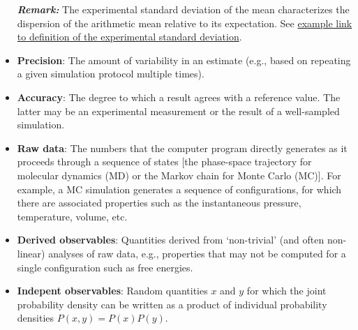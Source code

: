 \begin{itemize}
\textbf{\textit{Remark:}} The experimental standard deviation of the mean characterizes the dispersion of the arithmetic mean relative to its expectation.
See \hyperref[def:exp_st_dev]{example link to definition of the experimental standard deviation}.
  
\item {\bf Precision}: The amount of variability in an estimate (e.g., based on repeating a given simulation protocol multiple times).  %
  
  
\item {\bf Accuracy}: The degree to which a result agrees with a reference value.
The latter may be an experimental measurement or the result of a well-sampled simulation.  
  
\item {\bf Raw data}: The numbers that the computer program directly generates as it proceeds through a sequence of states [the phase-space trajectory for molecular dynamics (MD) or the Markov chain for Monte Carlo (MC)].
For example, a MC simulation generates a sequence of configurations, for which there are associated properties such as the instantaneous pressure, temperature, volume, etc.
  
\item {\bf Derived observables}: Quantities derived from `non-trivial' (and often non-linear) analyses of raw data, e.g., properties that may not be computed for a single configuration such as free energies.
  
\item {\bf Indepent observables}: Random quantities $x$ and $y$ for which the joint probability density can be written as a product of individual probability densities $P(x,y)=P(x)P(y)$.  
  

\end{itemize}
